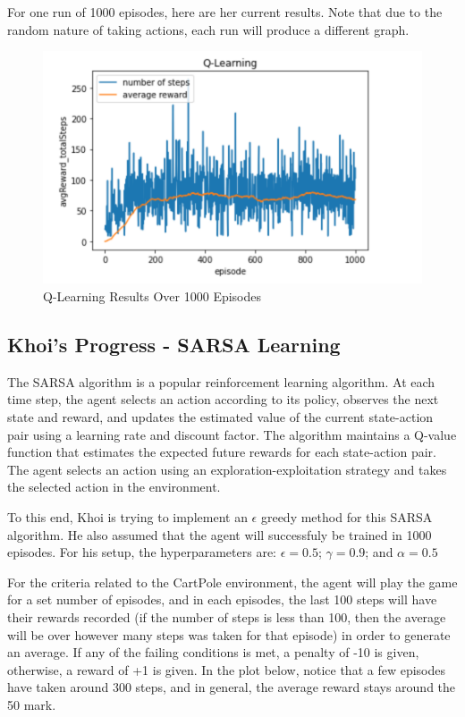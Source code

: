 \documentclass[nohyperref]{article}
\theoremstyle{plain}
\theoremstyle{definition}
\theoremstyle{remark}
\begin{document}
For one run of 1000 episodes, here are her current results. Note that due to the random nature of taking actions, each run will produce a different graph.

\begin{figure}[H] %
    \centering
    \includegraphics[width=1\linewidth]{q-learning-average-1k.png}
    \caption{Q-Learning Results Over 1000 Episodes}
\end{figure}

\subsection*{Khoi's Progress - SARSA Learning}
The SARSA algorithm is a popular reinforcement learning algorithm. At each time step, the agent selects an action according to its policy, observes the next state and reward, and updates the estimated value of the current state-action pair using a learning rate and discount factor. 
The algorithm maintains a Q-value function that estimates the expected future rewards for each state-action pair. The agent selects an action using an exploration-exploitation strategy and takes the selected action in the environment.

To this end, Khoi is trying to implement an $\epsilon$ greedy method for this SARSA algorithm. He also assumed that the agent will successfuly be trained in 1000 episodes. For his setup, the hyperparameters are: $\epsilon = 0.5$; $\gamma = 0.9$; and $\alpha = 0.5$

For the criteria related to the CartPole environment, the agent will play the game for a set number of episodes, and in each episodes, the last 100 steps will have their rewards recorded (if the number of steps is less than 100, then the average will be over however many steps was taken for that episode) in order to generate an average.
If any of the failing conditions is met, a penalty of -10 is given, otherwise, a reward of +1 is given. In the plot below, notice that a few episodes have taken around 300 steps, and in general, the average reward stays around the 50 mark.
\end{document}
